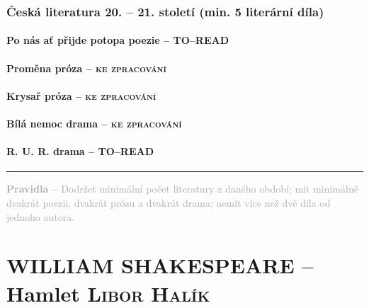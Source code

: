 \documentclass[A4paper]{extarticle} %
\begin{document}
\section*{Česká literatura 20. -- 21. století {\tiny{(min. 5 literární díla)}}}

\subsection*{Po nás ať přijde potopa {\tiny{poezie  -- \textsc{TO--READ}}}}

\subsection*{Proměna {\tiny{próza -- \textsc{ke zpracování}}}}

\subsection*{Krysař {\tiny{próza  -- \textsc{ke zpracování}}}}

\subsection*{Bílá nemoc {\tiny{drama  -- \textsc{ke zpracování}}}}

\subsection*{R. U. R. {\tiny{drama  -- \textsc{TO--READ}}}}

\vfill

\noindent\begin{minipage}{\textwidth}
    \textcolor{darkgray}{\rule{\linewidth}{0.4pt}
    \footnotesize
    \textbf{Pravidla --} Dodržet minimální počet literatury z daného období; mít minimálně dvakrát poezii, dvakrát prózu a dvakrát drama; nemít více než dvě díla od jednoho autora.
    }
\end{minipage}

\pagestyle{empty}


\newpage


\changefontsize{6.8pt}

\part*{WILLIAM SHAKESPEARE -- Hamlet {\hfill \normalfont\tiny\textsc{Libor Halík}}}
\end{document}
